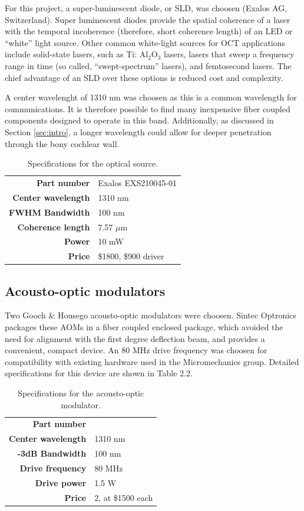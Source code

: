 For this project,  a super-luminescent diode, or SLD, was choosen (Exalos AG, Switzerland). Super luminescent diodes provide the spatial coherence of a laser with the temporal incoherence (therefore, short coherence length) of an LED or ``white'' light source. Other common white-light sources for OCT applications include solid-state lasers, such as Ti: Al$_2$O$_3$ lasers, lasers that sweep a frequency range in time (so called, ``swept-spectrum'' lasers), and femtosecond lasers. The chief advantage of an SLD over these options is reduced cost and complexity. \cite{bouma}

A center wavelenght of 1310 nm was choosen as this is a common wavelength for communications. It is therefore possible to find many inexpensive fiber coupled components designed to operate in this band. Additionally, as discussed in Section \ref{sec:intro}, a longer wavelength could allow for deeper penetration through the bony cochlear wall. \cite{Sandell2011} \cite{Bashkatov2006}

\begin{table}[h!]
\centering
\begin{tabular}{ >{\bf}r | l}
Part number & Exalos EXS210045-01 \\
Center wavelength & 1310 nm \\
FWHM Bandwidth & 100 nm \\
Coherence length & 7.57 $\mu$m \\
Power & 10 mW \\
Price & \$1800, \$900 driver \\
\end{tabular}
\caption{Specifications for the optical source.}
\end{table} 

\subsection{Acousto-optic modulators}

Two Gooch \& Housego acousto-optic modulators were choosen. Sintec Optronics packages these AOMs in a fiber coupled enclosed package, which avoided the need for alignment with the first degree deflection beam, and provides a convenient, compact device. An 80 MHz drive frequency was choosen for compatibility with existing hardware used in the Micromechanics group. Detailed specifications for this device are shown in Table 2.2.

\begin{table}[h!]
\centering
\begin{tabular}{ >{\bf}r | l}
Part number & \\
Center wavelength & 1310 nm \\
-3dB Bandwidth & 100 nm \\
Drive frequency & 80 MHz \\
Drive power & 1.5 W \\
Price & 2, at \$1500 each \\
\end{tabular}
\caption{Specifications for the acousto-optic modulator.}
\end{table} 

